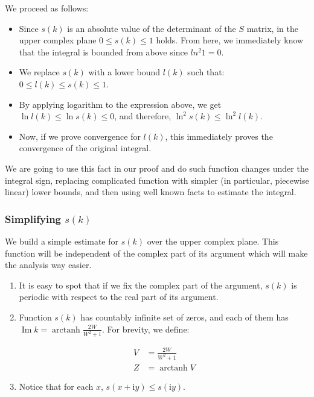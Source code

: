 \documentclass{gCOV2e}
\theoremstyle{plain}%
\theoremstyle{definition}
\theoremstyle{remark}
\begin{document}
We proceed as follows:

\begin{itemize}
\item Since $s(k)$ is an absolute value of the determinant of the $S$ matrix, in the upper complex plane $0 \le s(k) \le 1$ holds. From here, we immediately know that the integral is bounded from above since $ln^2 1 = 0$.
\item We replace $s(k)$ with a lower bound $l(k)$ such that: $0 \le l(k) \le s(k) \le 1$.
\item By applying logarithm to the expression above, we get $\ln l(k) \le \ln s(k) \le 0$, and therefore, $\ln^2 s(k) \le \ln^2 l(k)$.
\item Now, if we prove convergence for $l(k)$, this immediately proves the convergence of the original integral.
\end{itemize}

We are going to use this fact in our proof and do such function changes under the integral sign, replacing complicated function with simpler (in particular, piecewise linear) lower bounds, and then using well known facts to estimate the integral.

\subsubsection{Simplifying $s(k)$}
We build a simple estimate for $s(k)$ over the upper complex plane. This function will be independent of the complex part of its argument which will make the analysis way easier.

\begin{enumerate}
\item
  It is easy to spot that if we fix the complex part of the argument, $s(k)$ is periodic with respect to the real part of its argument.
\item 
  Function $s(k)$ has countably infinite set of zeros, and each of them has $\operatorname{Im} k = \operatorname{arctanh} \frac{2 W}{W^2 + 1}$. For brevity, we define:

  \begin{equation*}
  \begin{aligned}
     V &= \frac{2 W}{W^2 + 1}
  \\ Z &= \operatorname{arctanh} V
  \end{aligned}
  \end{equation*}
\item
  Notice that for each $x$, $s(x + \mathrm{i} y) \le s(\mathrm{i} y)$.
\end{enumerate}
\end{document}
